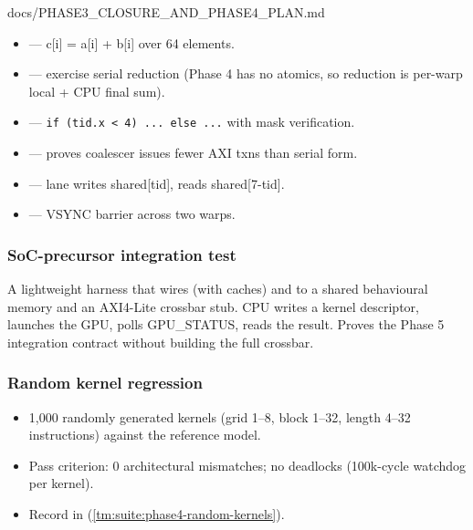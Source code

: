 \begin{relocated}{docs/PHASE3_CLOSURE_AND_PHASE4_PLAN.md}
\begin{itemize}
\tightlist
\item
   --- c{[}i{]} = a{[}i{]} + b{[}i{]} over 64
  elements.
\item
   --- exercise serial reduction (Phase 4
  has no atomics, so reduction is per-warp local + CPU final sum).
\item
   ---
  \texttt{if\ (tid.\allowbreak{}x\ <\ 4)\ .\allowbreak{}.\allowbreak{}.\allowbreak{}\ else\ .\allowbreak{}.\allowbreak{}.\allowbreak{}}
  with mask verification.
\item
   --- proves coalescer issues fewer AXI
  txns than serial form.
\item
   --- lane writes
  shared{[}tid{]}, reads shared{[}7-tid{]}.
\item
   --- VSYNC barrier across two warps.
\end{itemize}

\subsubsection{SoC-precursor integration test}\label{ds:ch:phase3-closure-phase4-plan:64-soc-precursor-integration-test}

A lightweight harness  that
wires  (with caches) and  to a shared
behavioural memory and an AXI4-Lite crossbar stub. CPU writes a kernel
descriptor, launches the GPU, polls GPU\_\allowbreak{}STATUS, reads the
result. Proves the Phase 5 integration contract without building the
full crossbar.

\subsubsection{Random kernel regression}\label{ds:ch:phase3-closure-phase4-plan:65-random-kernel-regression}

\begin{itemize}
\tightlist
\item
  1,000 randomly generated kernels (grid 1--8, block 1--32, length 4--32
  instructions) against the reference model.
\item
  Pass criterion: 0 architectural mismatches; no deadlocks (100k-cycle
  watchdog per kernel).
\item
  Record in  (\cref{tm:suite:phase4-random-kernels}).
\end{itemize}


\end{relocated}
